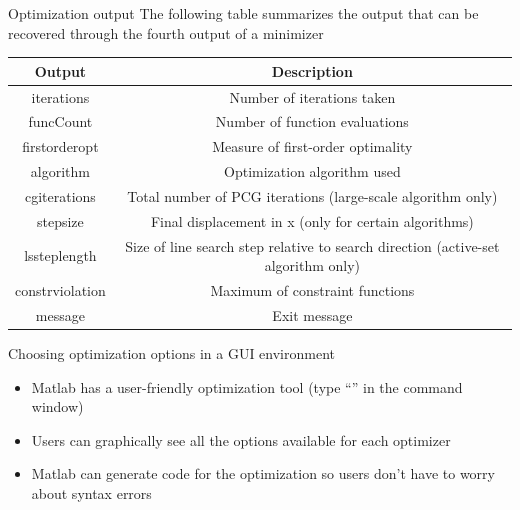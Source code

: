 \documentclass[english,xcolor=dvipsnames]{beamer}
\begin{document}
\begin{frame}{Optimization output}
The following table summarizes the output that can be recovered through the fourth output of a minimizer
\begin{center}
\begin{small}
\begin{tabular}{|c|c|}
\hline 
Output & Description\\
\hline 
\hline 
iterations & Number of iterations taken\\
\hline 
funcCount & Number of function evaluations\\
\hline 
firstorderopt & Measure of first-order optimality\\
\hline 
algorithm & Optimization algorithm used\\
\hline 
cgiterations & Total number of PCG iterations (large-scale algorithm only)\\
\hline 
stepsize & Final displacement in x (only for certain algorithms)\\
\hline 
lssteplength & Size of line search step relative to search direction (active-set
algorithm only)\\
\hline 
constrviolation & Maximum of constraint functions\\
\hline 
message & Exit message\\
\hline 
\end{tabular}
\end{small}
\end{center}
\end{frame}

\begin{frame}[fragile]{Choosing optimization options in a GUI environment}
\begin{itemize}
	\item Matlab has a user-friendly optimization tool (type ``'' in the command window)
	\item Users can graphically see all the options available for each optimizer
	\item Matlab can generate code for the optimization so users don't have to worry about syntax errors
\end{itemize}
\end{frame}
\end{document}

